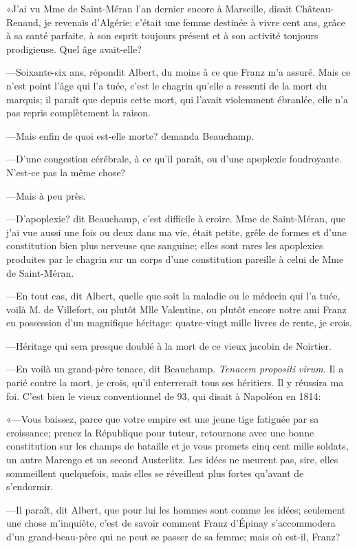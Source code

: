 «J'ai vu Mme de Saint-Méran l'an dernier encore à Marseille, disait Château-Renaud, je revenais d'Algérie; c'était une femme destinée à vivre cent ans, grâce à sa santé parfaite, à son esprit toujours présent et à son activité toujours prodigieuse. Quel âge avait-elle? 

—Soixante-six ans, répondit Albert, du moins à ce que Franz m'a assuré. Mais ce n'est point l'âge qui l'a tuée, c'est le chagrin qu'elle a ressenti de la mort du marquis; il paraît que depuis cette mort, qui l'avait violemment ébranlée, elle n'a pas repris complètement la raison. 

—Mais enfin de quoi est-elle morte? demanda Beauchamp. 

—D'une congestion cérébrale, à ce qu'il paraît, ou d'une apoplexie foudroyante. N'est-ce pas la même chose? 

—Mais à peu près. 

—D'apoplexie? dit Beauchamp, c'est difficile à croire. Mme de Saint-Méran, que j'ai vue aussi une fois ou deux dans ma vie, était petite, grêle de formes et d'une constitution bien plus nerveuse que sanguine; elles sont rares les apoplexies produites par le chagrin sur un corps d'une constitution pareille à celui de Mme de Saint-Méran. 

—En tout cas, dit Albert, quelle que soit la maladie ou le médecin qui l'a tuée, voilà M. de Villefort, ou plutôt Mlle Valentine, ou plutôt encore notre ami Franz en possession d'un magnifique héritage: quatre-vingt mille livres de rente, je crois. 

—Héritage qui sera presque doublé à la mort de ce vieux jacobin de Noirtier. 

—En voilà un grand-père tenace, dit Beauchamp. \textit{Tenacem propositi virum.} Il a parié contre la mort, je crois, qu'il enterrerait tous ses héritiers. Il y réussira ma foi. C'est bien le vieux conventionnel de 93, qui disait à Napoléon en 1814: 

«—Vous baissez, parce que votre empire est une jeune tige fatiguée par sa croissance; prenez la République pour tuteur, retournons avec une bonne constitution sur les champs de bataille et je vous promets cinq cent mille soldats, un autre Marengo et un second Austerlitz. Les idées ne meurent pas, sire, elles sommeillent quelquefois, mais elles se réveillent plus fortes qu'avant de s'endormir. 

—Il paraît, dit Albert, que pour lui les hommes sont comme les idées; seulement une chose m'inquiète, c'est de savoir comment Franz d'Épinay s'accommodera d'un grand-beau-père qui ne peut se passer de sa femme; mais où est-il, Franz? 

